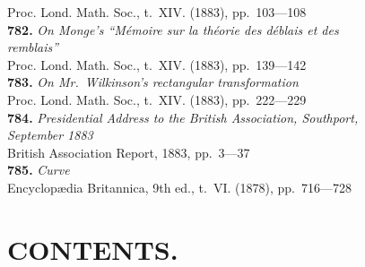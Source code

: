 \documentclass[12pt,a4paper,oneside]{book}
\theoremstyle{plain}
\theoremstyle{definition}
\theoremstyle{remark}
\begin{document}
\hspace*{2em}Proc. Lond. Math. Soc., t.~XIV. (1883), pp.~103---108\\[0.3em]
\textbf{782.} \textit{On Monge's ``M\'emoire sur la th\'eorie des d\'eblais et des}\\
\hspace*{2em}\textit{remblais''} \\
\hspace*{2em}Proc. Lond. Math. Soc., t.~XIV. (1883), pp.~139---142\\[0.3em]
\textbf{783.} \textit{On Mr.~Wilkinson's rectangular transformation} \\
\hspace*{2em}Proc. Lond. Math. Soc., t.~XIV. (1883), pp.~222---229\\[0.3em]
\textbf{784.} \textit{Presidential Address to the British Association, Southport,}\\
\hspace*{2em}\textit{September 1883} \\
\hspace*{2em}British Association Report, 1883, pp.~3---37\\[0.3em]
\textbf{785.} \textit{Curve} \\
\hspace*{2em}Encyclop\ae{}dia Britannica, 9th ed., t.~VI. (1878), pp.~716---728

\cleardoublepage

\chapter*{CONTENTS.}
\end{document}
